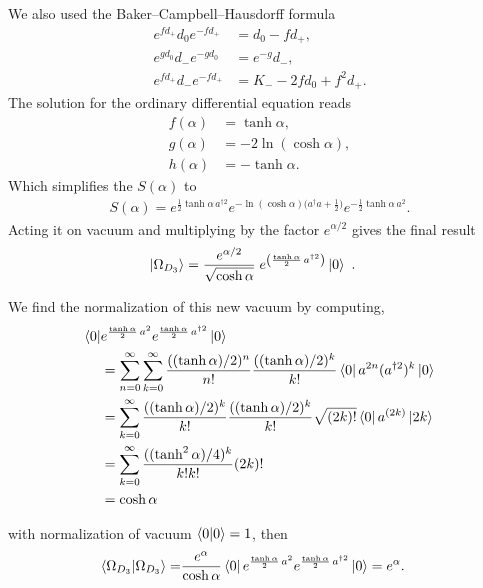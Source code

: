 \documentclass[%
 reprint,
superscriptaddress,
 amsmath,amssymb,
 aps,
]{revtex4-2}
\begin{document}
We also used the Baker–Campbell–Hausdorff formula
\begin{align}
    e^{f d_{+}}d_{0}e^{-f d_{+}}&=d_{0}-f d_{+},\\
e^{g d_{0}}d_{-}e^{-g d_{0}}&=e^{-g}d_{-},\\
e^{f d_{+}}d_{-}e^{-f d_{+}}&=K_{-}-2fd_{0}+f^{2}d_{+}.
\end{align}
The solution for the ordinary differential equation reads 
\begin{align}
    f(\alpha)&=\tanh\alpha,\\
g(\alpha)&=-2\ln(\cosh\alpha),\\
h(\alpha)&=-\tanh\alpha.
\end{align}
Which simplifies the $S(\alpha)$ to 
\begin{align}
    S(\alpha)
   =e^{\tfrac12\tanh\alpha\,a^{\dagger2}} e^{-\ln(\cosh\alpha)\bigl(a^{\dagger}a+\tfrac12\bigr)} e^{-\tfrac12\tanh\alpha\,a^{2}}.
\end{align}
Acting it on vacuum and multiplying by the factor \(e^{\alpha/2}\) gives the final result
\begin{align}
    \ket{\Omega_{D_{3}}}&=\frac{e^{\alpha/2}}{\sqrt{\cosh\alpha}}\;
     e^{\left(\frac{\tanh\alpha}{2}\,a^{\dagger2}\right)}\ket{0}~.
\end{align}

We find the normalization of this new vacuum by computing,
\begin{align}
    \bra{0}&e^{\frac{\tanh\alpha}{2}\,a^{2}} e^{\frac{\tanh\alpha}{2}\,a^{\dagger2}}\ket{0}\nonumber\\
    &=\sum_{n=0}^{\infty}\sum_{k=0}^{\infty}\frac{((\tanh\alpha)/2)^n}{n!}\frac{((\tanh\alpha)/2)^k}{k!}\bra{0}a^{2n} (a^{\dagger2})^k\ket{0}\nonumber\\
    &=\sum_{k=0}^{\infty}\frac{((\tanh\alpha)/2)^k}{k!}\frac{((\tanh\alpha)/2)^k}{k!}\sqrt{(2k)!}\bra{0}a^{(2k)} \ket{2k}\nonumber\\
    &=\sum_{k=0}^{\infty}\frac{((\tanh^2{\alpha})/4)^k}{k!k!}(2k)!\nonumber\\
    &=\cosh{\alpha}
\end{align}

with normalization of vacuum $\braket{0|0}=1$, then
\begin{align}
    \braket{\Omega_{D_{3}}|\Omega_{D_{3}}} =&  \frac{e^{\alpha}}{\cosh\alpha}  \bra{0}e^{\frac{\tanh\alpha}{2}\,a^{2}} e^{\frac{\tanh\alpha}{2}\,a^{\dagger2}}\ket{0}=e^{\alpha}.
\end{align}
\end{document}
